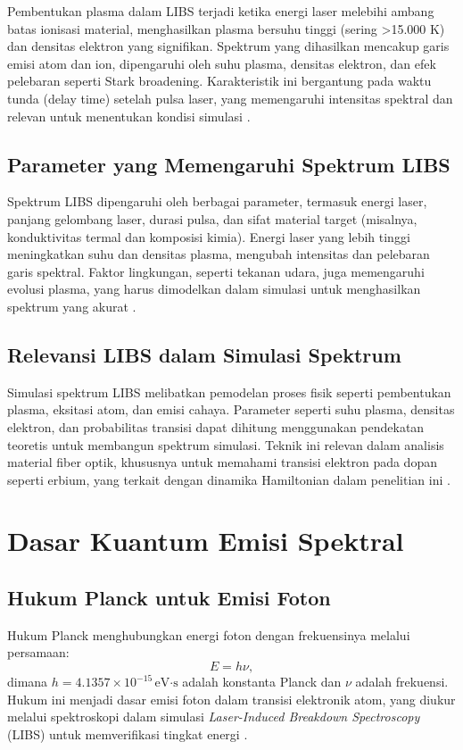 Pembentukan plasma dalam LIBS terjadi ketika energi laser melebihi ambang batas ionisasi material, menghasilkan plasma bersuhu tinggi (sering >15.000 K) dan densitas elektron yang signifikan. Spektrum yang dihasilkan mencakup garis emisi atom dan ion, dipengaruhi oleh suhu plasma, densitas elektron, dan efek pelebaran seperti Stark broadening. Karakteristik ini bergantung pada waktu tunda (delay time) setelah pulsa laser, yang memengaruhi intensitas spektral dan relevan untuk menentukan kondisi simulasi \citep{Singh2023}.

\subsection{Parameter yang Memengaruhi Spektrum LIBS}
\label{subsec:parameters}

Spektrum LIBS dipengaruhi oleh berbagai parameter, termasuk energi laser, panjang gelombang laser, durasi pulsa, dan sifat material target (misalnya, konduktivitas termal dan komposisi kimia). Energi laser yang lebih tinggi meningkatkan suhu dan densitas plasma, mengubah intensitas dan pelebaran garis spektral. Faktor lingkungan, seperti tekanan udara, juga memengaruhi evolusi plasma, yang harus dimodelkan dalam simulasi untuk menghasilkan spektrum yang akurat \citep{Singh2023}.

\subsection{Relevansi LIBS dalam Simulasi Spektrum}
\label{subsec:sim_relevance}

Simulasi spektrum LIBS melibatkan pemodelan proses fisik seperti pembentukan plasma, eksitasi atom, dan emisi cahaya. Parameter seperti suhu plasma, densitas elektron, dan probabilitas transisi dapat dihitung menggunakan pendekatan teoretis untuk membangun spektrum simulasi. Teknik ini relevan dalam analisis material fiber optik, khususnya untuk memahami transisi elektron pada dopan seperti erbium, yang terkait dengan dinamika Hamiltonian dalam penelitian ini \citep{Singh2023}.


\section{Dasar Kuantum Emisi Spektral}

\subsection{Hukum Planck untuk Emisi Foton}
Hukum Planck menghubungkan energi foton dengan frekuensinya melalui persamaan:
\begin{equation}
E = h\nu, \label{planck}
\end{equation}
dimana \( h = 4.1357 \times 10^{-15} \, \text{eV·s} \) adalah konstanta Planck dan \( \nu \) adalah frekuensi. Hukum ini menjadi dasar emisi foton dalam transisi elektronik atom, yang diukur melalui spektroskopi dalam simulasi \textit{Laser-Induced Breakdown Spectroscopy} (LIBS) untuk memverifikasi tingkat energi \citep{Beiser1992}.

